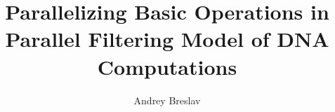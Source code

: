 \documentclass[a4paper, 17pt]{extarticle}
\begin{document}
\author{Andrey Breslav}
\title{Parallelizing Basic Operations in Parallel Filtering Model of DNA Computations}
\maketitle
\begin{abstract}

\end{abstract}
\thispagestyle{empty}

\pagestyle{plain}
\setcounter{page}{1}











\end{document}
